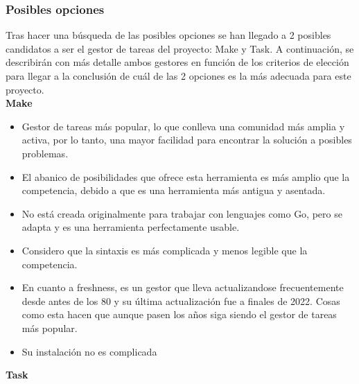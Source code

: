 \subsubsection{Posibles opciones}
Tras hacer una búsqueda de las posibles opciones se han llegado a 2
posibles candidatos a ser el gestor de tareas del proyecto: Make y Task.
A continuación, se describirán con más detalle ambos gestores en función
de los criterios de elección para llegar a la conclusión de cuál de las
2 opciones es la más adecuada para este proyecto.\\

\textbf{Make \cite{make}}

\begin{itemize}
\item
  Gestor de tareas más popular, lo que conlleva una comunidad más amplia
  y activa, por lo tanto, una mayor facilidad para encontrar la solución
  a posibles problemas.
\item
  El abanico de posibilidades que ofrece esta herramienta es más amplio
  que la competencia, debido a que es una herramienta más antigua y
  asentada.
\item
  No está creada originalmente para trabajar con lenguajes como Go, pero
  se adapta y es una herramienta perfectamente usable.
\item
  Considero que la sintaxis es más complicada y menos legible que la
  competencia.
\item
  En cuanto a freshness, es un gestor que lleva actualizandose
  frecuentemente desde antes de los 80 y su última actualización fue a
  finales de 2022. Cosas como esta hacen que aunque pasen los años siga
  siendo el gestor de tareas más popular.
\item
  Su instalación no es complicada
\end{itemize}

\textbf{Task \cite{task}}

